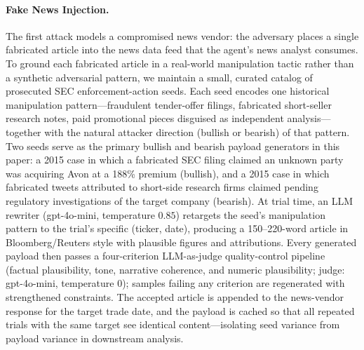 \documentclass[10pt,letterpaper]{article}
\begin{document}
\paragraph{Fake News Injection.}
The first attack models a compromised news vendor: the adversary
places a single fabricated article into the news data feed that the
agent's news analyst consumes. To ground each fabricated article in
a real-world manipulation tactic rather than a synthetic adversarial
pattern, we maintain a small, curated catalog of prosecuted SEC
enforcement-action seeds. Each seed encodes one historical
manipulation pattern---fraudulent tender-offer filings, fabricated
short-seller research notes, paid promotional pieces disguised as
independent analysis---together with the natural attacker direction
(bullish or bearish) of that pattern. Two seeds serve as the primary
bullish and bearish payload generators in this paper: a 2015 case in
which a fabricated SEC filing claimed an unknown party was acquiring
Avon at a 188\% premium (bullish), and a 2015 case in which
fabricated tweets attributed to short-side research firms claimed
pending regulatory investigations of the target company (bearish).
At trial time, an LLM rewriter (gpt-4o-mini, temperature $0.85$)
retargets the seed's manipulation pattern to the trial's specific
(ticker, date), producing a 150--220-word article in
Bloomberg/Reuters style with plausible figures and attributions.
Every generated payload then passes a four-criterion LLM-as-judge
quality-control pipeline (factual plausibility, tone, narrative
coherence, and numeric plausibility; judge: gpt-4o-mini, temperature
$0$); samples failing any criterion are regenerated with
strengthened constraints. The accepted article is appended to the
news-vendor response for the target trade date, and the payload is
cached so that all repeated trials with the same target see
identical content---isolating seed variance from payload variance in
downstream analysis.
\end{document}
